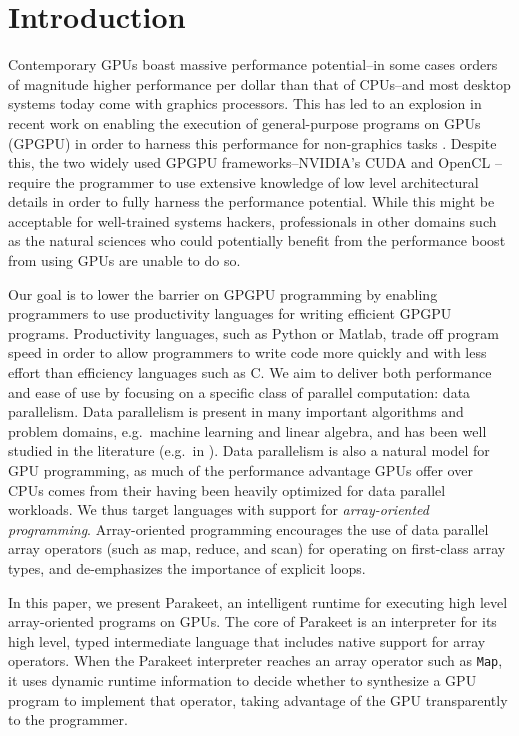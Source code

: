 \documentclass[preprint]{sigplanconf}
\begin{document}
\section{Introduction}

Contemporary GPUs boast massive performance potential--in some cases orders of
magnitude higher performance per dollar than that of CPUs--and most desktop
systems today come with graphics processors.  This has led to an explosion in
recent work on enabling the execution of general-purpose programs on GPUs
(GPGPU) in order to harness this performance for non-graphics tasks
\cite{Cata10,Main10,Muns10,NvidCU,Sven08,Tard06}. Despite this, the two widely
used GPGPU frameworks--NVIDIA's CUDA \cite{NvidCU} and OpenCL
\cite{Muns10}--require the programmer to use extensive knowledge of low level
architectural details in order to fully harness the performance potential.
While this might be acceptable for well-trained systems hackers, professionals
in other domains such as the natural sciences who could potentially
benefit from the performance boost from using GPUs are unable to do so.

Our goal is to lower the barrier on GPGPU programming by
enabling programmers to use productivity languages for writing
efficient GPGPU programs. Productivity languages, such as Python or Matlab,
trade off program speed in order to allow programmers to write code more quickly
and with less effort than efficiency languages such as C.  We aim to deliver
both performance and ease of use by focusing on a specific class of parallel
computation: data parallelism.  Data parallelism is present in many important
algorithms and problem domains, e.g.\ machine learning and linear algebra, and
has been well studied in the literature (e.g.\ in \cite{Blel90}).  Data
parallelism is also a natural
model for GPU programming, as much of the performance advantage GPUs offer over
CPUs comes from their having been heavily optimized for data parallel workloads.
 We thus target languages with support for \emph{array-oriented programming}.
Array-oriented programming encourages the use of data parallel array operators
(such as map, reduce, and scan) for operating on first-class array types, and
de-emphasizes the importance of explicit loops.

In this paper, we present Parakeet, an intelligent runtime for executing high
level array-oriented programs on GPUs.  The core of Parakeet is an interpreter
for its high level, typed intermediate language that includes native support for
array operators.  When the Parakeet interpreter reaches an array operator such
as {\tt Map}, it uses dynamic runtime information to decide whether to
synthesize a GPU program to implement that operator, taking advantage of the
GPU transparently to the programmer.
\end{document}
